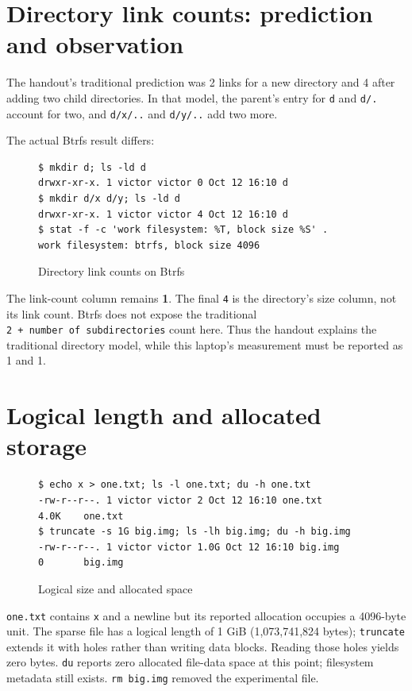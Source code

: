 \documentclass{../latex/utmreport}
\begin{document}
\section{Directory link counts: prediction and
observation}\label{directory-link-counts-prediction-and-observation}

The handout's traditional prediction was 2 links for a new directory and
4 after adding two child directories. In that model, the parent's entry
for \texttt{d} and \texttt{d/.} account for two, and \texttt{d/x/..} and
\texttt{d/y/..} add two more.

The actual Btrfs result differs:

\begin{figure}[H]
\begin{lstlisting}
$ mkdir d; ls -ld d
drwxr-xr-x. 1 victor victor 0 Oct 12 16:10 d
$ mkdir d/x d/y; ls -ld d
drwxr-xr-x. 1 victor victor 4 Oct 12 16:10 d
$ stat -f -c 'work filesystem: %T, block size %S' .
work filesystem: btrfs, block size 4096
\end{lstlisting}
\caption{Directory link counts on Btrfs}
\end{figure}

The link-count column remains \textbf{1}. The final \texttt{4} is the
directory's size column, not its link count. Btrfs does not expose the
traditional \texttt{2\ +\ number\ of\ subdirectories} count here. Thus
the handout explains the traditional directory model, while this
laptop's measurement must be reported as 1 and 1.

\section{Logical length and allocated
storage}\label{logical-length-and-allocated-storage}

\begin{figure}[H]
\begin{lstlisting}
$ echo x > one.txt; ls -l one.txt; du -h one.txt
-rw-r--r--. 1 victor victor 2 Oct 12 16:10 one.txt
4.0K    one.txt
$ truncate -s 1G big.img; ls -lh big.img; du -h big.img
-rw-r--r--. 1 victor victor 1.0G Oct 12 16:10 big.img
0       big.img
\end{lstlisting}
\caption{Logical size and allocated space}
\end{figure}

\texttt{one.txt} contains \texttt{x} and a newline but its reported
allocation occupies a 4096-byte unit. The sparse file has a logical
length of 1 GiB (1,073,741,824 bytes); \texttt{truncate} extends it with
holes rather than writing data blocks. Reading those holes yields zero
bytes. \texttt{du} reports zero allocated file-data space at this point;
filesystem metadata still exists. \texttt{rm\ big.img} removed the
experimental file.
\end{document}
